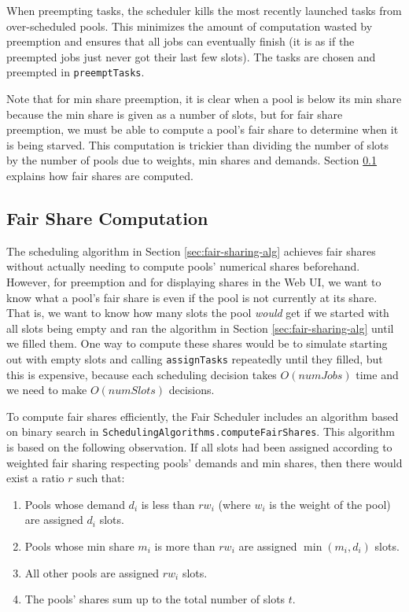 \documentclass[11pt]{article}
\begin{document}
When preempting tasks, the scheduler kills the most recently launched tasks from over-scheduled pools. This minimizes the amount of computation wasted by preemption and ensures that all jobs can eventually finish (it is as if the preempted jobs just never got their last few slots). The tasks are chosen and preempted in {\tt preemptTasks}.

Note that for min share preemption, it is clear when a pool is below its min share because the min share is given as a number of slots, but for fair share preemption, we must be able to compute a pool's fair share to determine when it is being starved. This computation is trickier than dividing the number of slots by the number of pools due to weights, min shares and demands. Section \ref{sec:fair-share-computation} explains how fair shares are computed.

\subsection{Fair Share Computation}
\label{sec:fair-share-computation}

The scheduling algorithm in Section \ref{sec:fair-sharing-alg} achieves fair shares without actually needing to compute pools' numerical shares beforehand. However, for preemption and for displaying shares in the Web UI, we want to know what a pool's fair share is even if the pool is not currently at its share. That is, we want to know how many slots the pool \emph{would} get if we started with all slots being empty and ran the algorithm in Section \ref{sec:fair-sharing-alg} until we filled them.
One way to compute these shares would be to simulate starting out with empty slots and calling {\tt assignTasks} repeatedly until they filled, but this is expensive, because each scheduling decision takes $O(numJobs)$ time and we need to make $O(numSlots)$ decisions.

To compute fair shares efficiently, the Fair Scheduler includes an algorithm based on binary search in {\tt SchedulingAlgorithms.computeFairShares}. This algorithm is based on the following observation. If all slots had been assigned according to weighted fair sharing respecting pools' demands and min shares, then there would exist a ratio $r$ such that:
\begin{enumerate}
  \item Pools whose demand $d_i$ is less than $r w_i$ (where $w_i$ is the weight of the pool) are assigned $d_i$ slots.
  \item Pools whose min share $m_i$ is more than $r w_i$ are assigned $\min(m_i, d_i)$ slots.
  \item All other pools are assigned $r w_i$ slots.
  \item The pools' shares sum up to the total number of slots $t$.
\end{enumerate}
\end{document}
